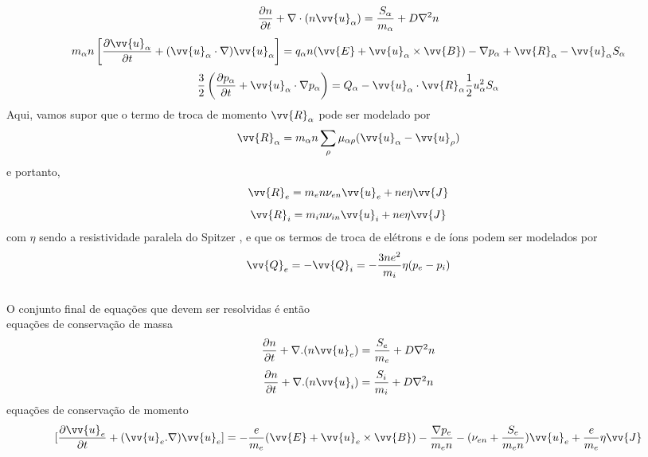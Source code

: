 \documentclass[12pt,oneside,a4paper]{abntex2}
\begin{document}
\begin{equation}
\frac{\partial n}{\partial t} + \nabla \cdot (n \vv{u}_\alpha) = \frac{S_\alpha}{m_\alpha}+D\nabla^2 n
\end{equation}
\begin{equation}
m_\alpha n \left[ \frac{\partial \vv{u}_\alpha}{\partial t} + (\vv{u}_\alpha \cdot \nabla)\vv{u}_\alpha \right] =  q_\alpha n (\vv{E}+\vv{u}_\alpha \times \vv{B}) - \nabla p_\alpha + \vv{R}_\alpha - \vv{u}_\alpha S_\alpha 
\end{equation}
\begin{equation} 
\frac{3}{2} \left( \frac{\partial p_\alpha}{\partial t} + \vv{u}_\alpha \cdot \nabla p_\alpha \right) =Q_\alpha -\vv{u}_\alpha \cdot \vv{R}_\alpha \frac{1}{2} u^2_\alpha S_\alpha
\end{equation}
Aqui, vamos supor que o termo de troca de momento $\vv{R}_\alpha$ pode ser modelado por
\begin{equation}
\vv{R}_\alpha = m_\alpha n \sum_\rho  \mu_{\alpha \rho}(\vv{u}_\alpha - \vv{u}_\rho)
\end{equation}
e portanto,
\begin{equation}
\vv{R}_e = m_e n \nu_{en}\vv{u}_e+ne\eta \vv{J}
\end{equation}
\begin{equation}
\vv{R}_i = m_i n \nu_{in}\vv{u}_i+ne\eta \vv{J}
\end{equation}
com $\eta$ sendo a resistividade paralela do Spitzer \cite[2.16]{tokamaks}, e que os termos de troca de elétrons e de íons podem ser modelados por
\begin{equation}
\vv{Q}_e = -\vv{Q}_i = -\frac{3ne^2}{m_i} \eta (p_e-p_i)
\end{equation}
\\
O conjunto final de equações que devem ser resolvidas é então\\
equações de conservação de massa
\begin{equation}
\label{eq: pit1}
\frac{\partial n}{\partial t} + \nabla.(n \vv{u}_e) = \frac{S_e}{m_e}+D\nabla^2 n
\end{equation}
\begin{equation} 
\label{eq: pit2}
\frac{\partial n}{\partial t} + \nabla.(n \vv{u}_i) = \frac{S_i}{m_i}+D\nabla^2 n
\end{equation}
equações de conservação de momento
\begin{equation}
\label{eq: pit51}
[\frac{\partial \vv{u}_e}{\partial t} + (\vv{u}_e . \nabla)\vv{u}_e] = - \frac{e}{m_e} (\vv{E}+\vv{u}_e \times \vv{B}) - \frac{\nabla p_e}{m_e n} - (\nu_{en}+\frac{S_e}{m_e n})\vv{u}_e + \frac{e}{m_e}\eta \vv{J} 
\end{equation}
\end{document}
